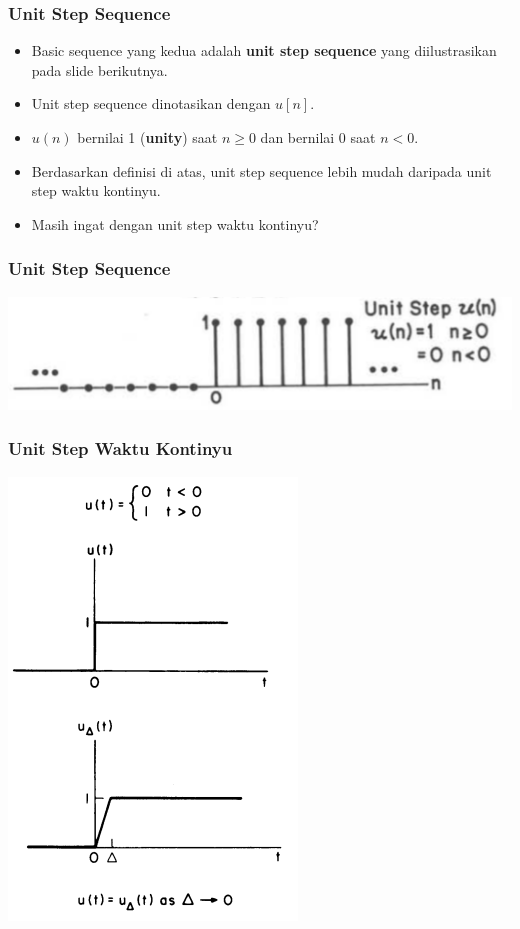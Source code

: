 \documentclass[pdflatex,compress]{beamer}
\begin{document}
\begin{frame}
	\frametitle{Unit Step Sequence}
	\begin{itemize}
		\item Basic sequence yang kedua adalah \textbf{unit step sequence} yang diilustrasikan pada slide berikutnya.
		\item Unit step sequence dinotasikan dengan $ u[n] $.
		\item $ u(n) $ bernilai 1 (\textbf{unity}) saat $ n \geq 0 $ dan bernilai 0 saat $ n < 0 $.
		\item Berdasarkan definisi di atas, unit step sequence lebih mudah daripada unit step waktu kontinyu.
		\item Masih ingat dengan unit step waktu kontinyu?
	\end{itemize}
\end{frame}

\begin{frame}
	\frametitle{Unit Step Sequence}
	\begin{center}
		\includegraphics[width=\linewidth]{img/img003}
	\end{center}
\end{frame}

\begin{frame}
	\frametitle{Unit Step Waktu Kontinyu}
	\begin{center}
		\includegraphics[height=0.9\textheight]{img/img006}
	\end{center}
\end{frame}
\end{document}
